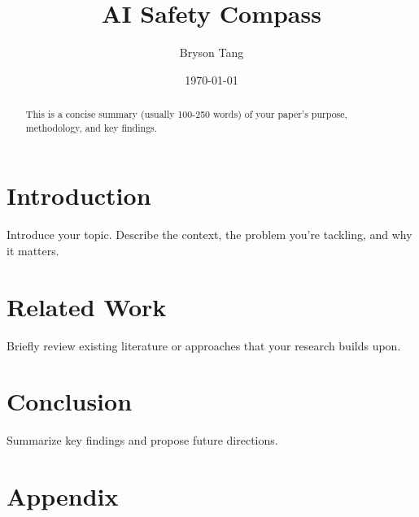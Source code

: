 \documentclass[11pt]{article}
\title{AI Safety Compass}
\author{Bryson Tang}
\date{\today}
\begin{document}
\maketitle

\begin{abstract}
This is a concise summary (usually 100-250 words) of your paper's purpose, methodology, and key findings.
\end{abstract}

\section{Introduction}
Introduce your topic. Describe the context, the problem you're tackling, and why it matters.

\section{Related Work}
Briefly review existing literature or approaches that your research builds upon.







\section{Conclusion}
Summarize key findings and propose future directions.

% 
% 

\newpage
\appendix
\section*{Appendix}

\end{document}
